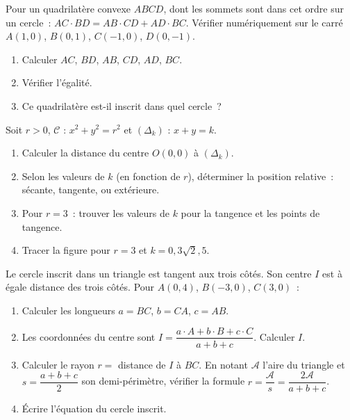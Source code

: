\begin{challenge}
Pour un quadrilat\`ere convexe $ABCD$, dont les sommets sont dans cet ordre sur un cercle~:
$AC\cdot BD = AB\cdot CD + AD\cdot BC.$
V\'erifier num\'eriquement sur le carr\'e $A(1,0)$, $B(0,1)$, $C(-1,0)$, $D(0,-1)$.
\begin{enumerate}
  \item Calculer $AC$, $BD$, $AB$, $CD$, $AD$, $BC$.
  \item V\'erifier l'\'egalit\'e.
  \item Ce quadrilat\`ere est-il inscrit dans quel cercle~?
\end{enumerate}
\end{challenge}

\begin{challenge}
Soit $r>0$, $\mathcal{C}$ : $x^2+y^2=r^2$ et $(\Delta_k)$ : $x+y=k$.
\begin{enumerate}
  \item Calculer la distance du centre $O(0,0)$ \`a $(\Delta_k)$.
  \item Selon les valeurs de $k$ (en fonction de $r$), d\'eterminer
        la position relative~: s\'ecante, tangente, ou ext\'erieure.
  \item Pour $r=3$~: trouver les valeurs de $k$ pour la tangence
        et les points de tangence.
  \item Tracer la figure pour $r=3$ et $k=0, 3\sqrt{2}, 5$.
\end{enumerate}
\end{challenge}

\begin{challenge}
Le cercle inscrit dans un triangle est tangent aux trois c\^ot\'es.
Son centre $I$ est \`a \'egale distance des trois c\^ot\'es.
Pour $A(0,4)$, $B(-3,0)$, $C(3,0)$~:
\begin{enumerate}
  \item Calculer les longueurs $a=BC$, $b=CA$, $c=AB$.
  \item Les coordonn\'ees du centre sont $I=\dfrac{a\cdot A+b\cdot B+c\cdot C}{a+b+c}$.
        Calculer $I$.
  \item Calculer le rayon $r = $ distance de $I$ \`a $BC$.
        En notant $\mathcal A$ l'aire du triangle et
        $s=\dfrac{a+b+c}{2}$ son demi-p\'erim\`etre, v\'erifier la formule
        $r=\dfrac{\mathcal A}{s}=\dfrac{2\mathcal A}{a+b+c}$.
  \item \'Ecrire l'\'equation du cercle inscrit.
\end{enumerate}
\end{challenge}

